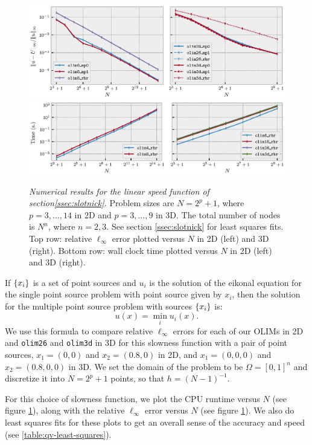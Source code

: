 \documentclass[smallcondensed]{svjour3}
\begin{document}
\begin{figure}
  \centering
  \includegraphics[width=\linewidth]{qv_plots.eps}
  \includegraphics[width=\linewidth]{qv-time-plots.eps}
  \caption{\emph{Numerical results for the linear speed function of
      section\@ \ref{ssec:slotnick}.} Problem sizes are $N = 2^p + 1$,
    where $p = 3, \hdots, 14$ in 2D and $p = 3, \hdots, 9$ in 3D. The
    total number of nodes is $N^n$, where $n = 2, 3$. See section\@
    \ref{ssec:slotnick} for least squares fits. Top row: relative
    $\ell_\infty$ error plotted versus $N$ in 2D (left) and 3D
    (right). Bottom row: wall clock time plotted versus $N$ in 2D
    (left) and 3D (right).}\label{fig:slotnick-plots}
\end{figure}

If $\left\{x_i\right\}$ is a set of point sources and $u_i$ is the solution of
the eikonal equation for the single point source problem with point
source given by $x_i$, then the solution for the multiple point source
problem with sources $\left\{x_i\right\}$ is:
\begin{equation}
  u(x) = \min_i u_i(x).
\end{equation}
We use this formula to compare relative $\ell_\infty$ errors for each
of our OLIMs in 2D and \texttt{olim26} and \texttt{olim3d} in 3D for
this slowness function with a pair of point sources, $x_1 = (0, 0)$
and $x_2 = (0.8, 0)$ in 2D, and $x_1 = (0, 0, 0)$ and
$x_2 = (0.8, 0, 0)$ in 3D. We set the domain of the problem to be
$\Omega = [0, 1]^n$ and discretize it into $N = 2^p + 1$ points, so
that $h = (N-1)^{-1}$.

For this choice of slowness function, we plot the CPU runtime versus
$N$ (see figure \ref{fig:slotnick-plots}), along with the relative
$\ell_\infty$ error versus $N$ (see figure
\ref{fig:slotnick-plots}). We also do least squares fits for these
plots to get an overall sense of the accuracy and speed (see
\ref{table:qv-least-squares}).
\end{document}
